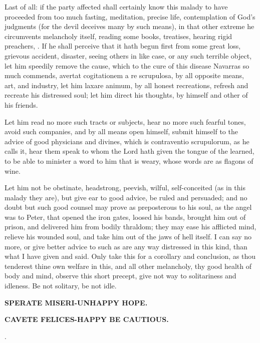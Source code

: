 {Last of all: if the party affected shall certainly know this malady to
have proceeded from too much fasting, meditation, precise life,
contemplation of God's judgments (for the devil deceives many by such
means), in that other extreme he circumvents melancholy itself, reading
some books, treatises, hearing rigid preachers, \etc{}. If he shall
perceive that it hath begun first from some great loss, grievous
accident, disaster, seeing others in like case, or any such terrible
object, let him speedily remove the cause, which to the cure of this
disease Navarras so much commends, avertat cogitationem a re
scrupulosa, by all opposite means, art, and industry, let him laxare
animum, by all honest recreations, refresh and recreate his distressed
soul; let him direct his thoughts, by himself and other of his friends.

Let him read no more such tracts or subjects, hear no more such fearful
tones, avoid such companies, and by all means open himself, submit
himself to the advice of good physicians and divines, which is
contraventio scrupulorum, as he calls it, hear them speak to whom
the Lord hath given the tongue of the learned, to be able to minister a
word to him that is weary, whose words are as flagons of wine.

Let him not be obstinate, headstrong, peevish, wilful, self-conceited
(as in this malady they are), but give ear to good advice, be ruled and
persuaded; and no doubt but such good counsel may prove as preposterous
to his soul, as the angel was to Peter, that opened the iron gates,
loosed his bands, brought him out of prison, and delivered him from
bodily thraldom; they may ease his afflicted mind, relieve his wounded
soul, and take him out of the jaws of hell itself. I can say no more,
or give better advice to such as are any way distressed in this kind,
than what I have given and said. Only take this for a corollary and
conclusion, as thou tenderest thine own welfare in this, and all other
melancholy, thy good health of body and mind, observe this short
precept, give not way to solitariness and idleness. Be not solitary, be
not idle.

\textbf{\textlatin{SPERATE MISERI}-UNHAPPY HOPE.}

\textbf{\textlatin{CAVETE FELICES}-HAPPY BE CAUTIOUS.}

 \Austin{}.
}

